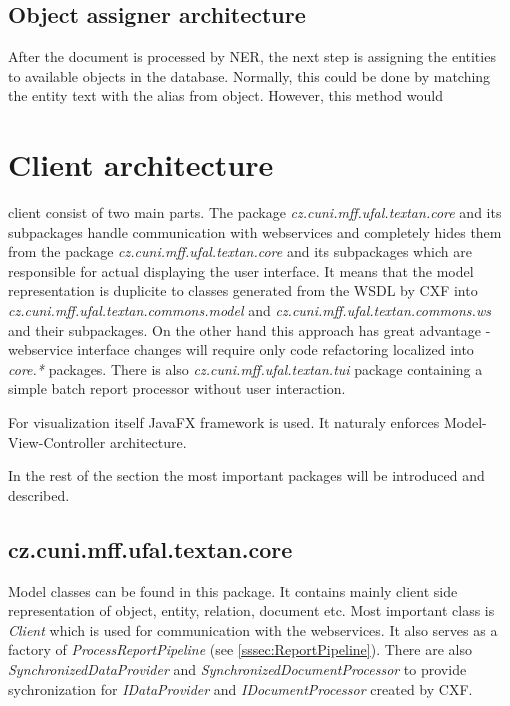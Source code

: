 \subsection{Object assigner architecture} 


After the document is processed by NER, the next step is assigning the entities
to available objects in the database. Normally, this could be done by matching
the entity text with the alias from object. However, this method would 

\section{Client architecture}



\textan{} client consist of two main parts. The package
\emph{cz.cuni.mff.ufal.textan.core} and its subpackages handle communication
with webservices and completely hides them from the package
\emph{cz.cuni.mff.ufal.textan.core} and its subpackages which are responsible
for actual displaying the user interface. It means that the model representation
is duplicite to classes generated from the WSDL by CXF into
\emph{cz.cuni.mff.ufal.textan.commons.model} and
\emph{cz.cuni.mff.ufal.textan.commons.ws} and their subpackages. On the other
hand this approach has great advantage - webservice interface changes will
require only code refactoring localized into \emph{core.*} packages. There is
also \emph{cz.cuni.mff.ufal.textan.tui} package containing a simple batch report
processor without user interaction.


For visualization itself JavaFX framework is used. It naturaly enforces
Model-View-Controller architecture.

In the rest of the section the most important packages will be introduced and
described.

\subsection{cz.cuni.mff.ufal.textan.core}

Model classes can be found in this package. It contains mainly client side
representation of object, entity, relation, document etc. Most important class
is \emph{Client} which is used for communication with the webservices. It also
serves as a factory of \emph{ProcessReportPipeline} (see
\ref{sssec:ReportPipeline}). There are also \emph{SynchronizedDataProvider} and
\emph{SynchronizedDocumentProcessor} to provide sychronization for
\emph{IDataProvider} and \emph{IDocumentProcessor} created by CXF.

